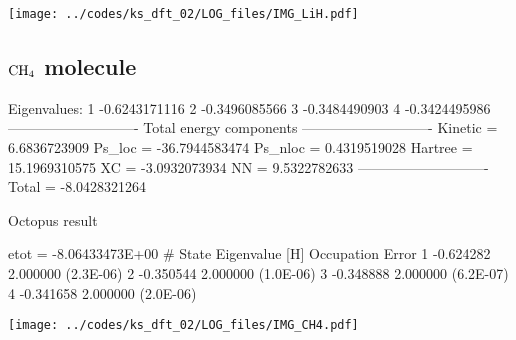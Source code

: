 {\centering
\texttt{[image: ../codes/ks\_dft\_02/LOG\_files/IMG\_LiH.pdf]}
}



\subsection{$\ce{CH4}$ molecule}

\begin{textcode}
Eigenvalues:
  1      -0.6243171116
  2      -0.3496085566
  3      -0.3484490903
  4      -0.3424495986
----------------------------
Total energy components
----------------------------
Kinetic =       6.6836723909
Ps_loc  =     -36.7944583474
Ps_nloc =       0.4319519028
Hartree =      15.1969310575
XC      =      -3.0932073934
NN      =       9.5322782633
----------------------------
Total   =      -8.0428321264 
\end{textcode}


Octopus result
\begin{textcode}
 etot  = -8.06433473E+00
#  State  Eigenvalue [H]  Occupation    Error
      1       -0.624282    2.000000   (2.3E-06)
      2       -0.350544    2.000000   (1.0E-06)
      3       -0.348888    2.000000   (6.2E-07)
      4       -0.341658    2.000000   (2.0E-06)   
\end{textcode}

{\centering
\texttt{[image: ../codes/ks\_dft\_02/LOG\_files/IMG\_CH4.pdf]}
}